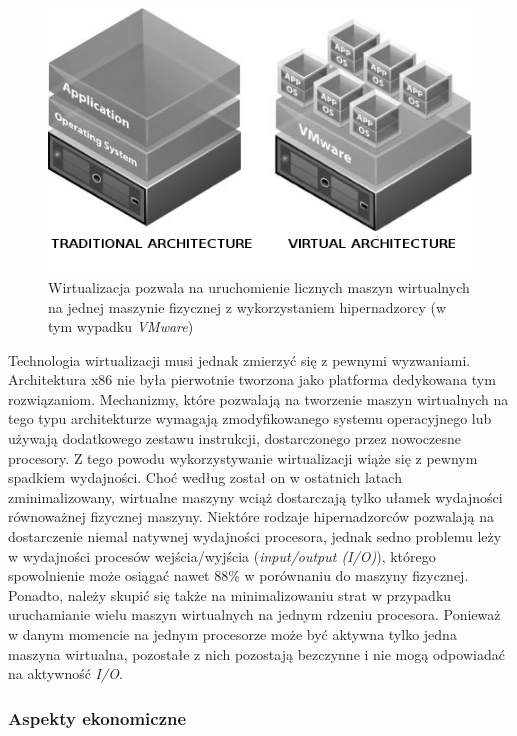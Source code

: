 \documentclass[12pt,a4paper,twoside]{article}
\begin{document}
\begin{figure}[h]
  \centering
\includegraphics[scale=0.8]{../obrazy/fig:vm.png}
\caption{Wirtualizacja pozwala na uruchomienie licznych maszyn wirtualnych na jednej maszynie fizycznej z wykorzystaniem hipernadzorcy (w tym wypadku \textit{VMware}) \label{fig:vm}}
\end{figure}

Technologia wirtualizacji musi jednak zmierzyć się z pewnymi wyzwaniami. Architektura x86 nie była pierwotnie tworzona jako platforma dedykowana tym rozwiązaniom. Mechanizmy, które pozwalają na tworzenie maszyn wirtualnych na tego typu architekturze wymagają zmodyfikowanego systemu operacyjnego lub używają dodatkowego zestawu instrukcji, dostarczonego przez nowoczesne procesory. Z tego powodu wykorzystywanie wirtualizacji wiąże się z pewnym spadkiem wydajności. Choć według \citet{menon2005} został on w ostatnich latach zminimalizowany, wirtualne maszyny wciąż dostarczają tylko ułamek wydajności równoważnej fizycznej maszyny. Niektóre rodzaje hipernadzorców pozwalają na dostarczenie niemal natywnej wydajności procesora, jednak sedno problemu leży w wydajności procesów wejścia/wyjścia (\textit{input/output (I/O)}), którego spowolnienie może osiągać nawet 88\% w porównaniu do maszyny fizycznej. Ponadto, należy skupić się także na minimalizowaniu strat w przypadku uruchamianie wielu maszyn wirtualnych na jednym rdzeniu procesora. Ponieważ w danym momencie na jednym procesorze może być aktywna tylko jedna maszyna wirtualna, pozostałe z nich pozostają bezczynne i nie mogą odpowiadać na aktywność \textit{I/O}.

\subsubsection{Aspekty ekonomiczne}
\end{document}

